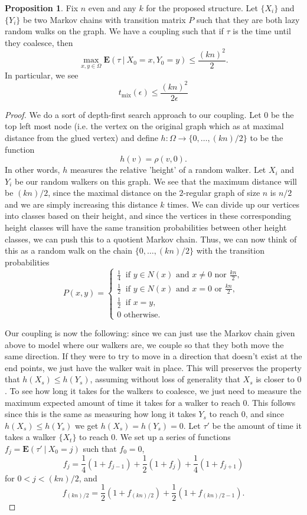 \documentclass[10pt,a4paper]{amsart}
\theoremstyle{definition}
\numberwithin{definition}{section}
\newtheorem{proposition}[definition]{Proposition}
\begin{document}
\begin{proposition}\label{prop:2}
Fix $n$ even and any $k$ for the proposed structure. Let $\{X_i\}$ and $\{Y_i\}$ be two Markov chains with transition matrix $P$ such that they are both lazy random walks on the graph. We have a coupling such that if $\tau$ is the time until they coalesce, then 
\[\max_{x,y \in \Omega} \mathbf{E}(\tau \ | \ X_0 = x, Y_0 = y) \leq \frac{(kn)^2}{2}. \]
In particular, we see   
\[ t_{\text{mix}}(\epsilon) \leq \frac{(kn)^2}{2 \epsilon}\]
\end{proposition}

\begin{proof}
We do a sort of depth-first search approach to our coupling. Let $0$ be the top left most node (i.e. the vertex on the original graph which as at maximal distance from the glued vertex) and define $h : \Omega \rightarrow \{0, \ldots, (kn)/2\}$ to be the function
\[ h(v) = \rho(v, 0). \]
In other words, $h$ measures the relative 'height' of a random walker. Let $X_i$ and $Y_i$ be our random walkers on this graph. We see that the maximum distance will be $(kn)/2$, since the maximal distance on the $2$-regular graph of size $n$ is $n/2$ and we are simply increasing this distance $k$ times. We can divide up our vertices into classes based on their height, and since the vertices in these corresponding height classes will have the same transition probabilities between other height classes, we can push this to a quotient Markov chain. Thus, we can now think of this as a random walk on the chain $\{0, \ldots, (kn)/2\}$ with the transition probabilities 
\[ P(x,y) = \begin{cases} \frac{1}{4} \ \text{ if } y \in N(x) \text{ and } x \neq 0 \text{ nor } \frac{kn}{2}, \\
\frac{1}{2} \ \text{ if } y \in N(x) \text{ and } x = 0 \text{ or } \frac{kn}{2}, \\ 
\frac{1}{2} \ \text{ if } x = y, \\
0 \text{ otherwise.}
\end{cases} \]

Our coupling is now the following: since we can just use the Markov chain given above to model where our walkers are, we couple so that they both move the same direction. If they were to try to move in a direction that doesn't exist at the end points, we just have the walker wait in place. This will preserves the property that $h(X_s) \leq h(Y_s)$, assuming without loss of generality that $X_s$ is closer to $0$. To see how long it takes for the walkers to coalesce, we just need to measure the maximum expected amount of time it takes for a walker to reach $0$. This follows since this is the same as measuring how long it takes $Y_s$ to reach $0$, and since $h(X_s) \leq h(Y_s)$ we get $h(X_s) = h(Y_s) = 0$. Let $\tau'$ be the amount of time it takes a walker $\{X_t\}$ to reach $0$. We set up a series of functions $f_j = \mathbf{E}(\tau' \ | \ X_0 = j)$ such that $f_0 = 0$, 
\[f_j = \frac{1}{4}\left(1 + f_{j-1}\right) + \frac{1}{2}(1+f_j) + \frac{1}{4}(1+f_{j+1})  \]
for $0 < j < (kn)/2$, and 
\[ f_{(kn)/2} = \frac{1}{2}(1+f_{(kn)/2}) + \frac{1}{2}(1+f_{(kn)/2-1}).\]


\end{proof}
\end{document}
